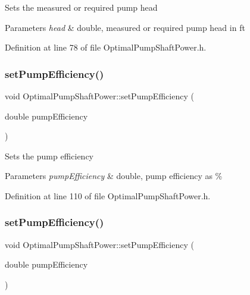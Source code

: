 Sets the measured or required pump head 
\begin{DoxyParams}{Parameters}
{\em head} & double, measured or required pump head in ft \\
\hline
\end{DoxyParams}


Definition at line 78 of file Optimal\+Pump\+Shaft\+Power.\+h.

\mbox{\label{class_optimal_pump_shaft_power_a2cb2c6b537c7db0bc5071f09c66308d0}} 
\subsubsection{\texorpdfstring{set\+Pump\+Efficiency()}{setPumpEfficiency()}\hspace{0.1cm}{\footnotesize\ttfamily [1/3]}}
{\footnotesize\ttfamily void Optimal\+Pump\+Shaft\+Power\+::set\+Pump\+Efficiency (\begin{DoxyParamCaption}\item[{double}]{pump\+Efficiency }\end{DoxyParamCaption})\hspace{0.3cm}{\ttfamily [inline]}}

Sets the pump efficiency 
\begin{DoxyParams}{Parameters}
{\em pump\+Efficiency} & double, pump efficiency as \% \\
\hline
\end{DoxyParams}


Definition at line 110 of file Optimal\+Pump\+Shaft\+Power.\+h.

\mbox{\label{class_optimal_pump_shaft_power_a2cb2c6b537c7db0bc5071f09c66308d0}} 
\subsubsection{\texorpdfstring{set\+Pump\+Efficiency()}{setPumpEfficiency()}\hspace{0.1cm}{\footnotesize\ttfamily [2/3]}}
{\footnotesize\ttfamily void Optimal\+Pump\+Shaft\+Power\+::set\+Pump\+Efficiency (\begin{DoxyParamCaption}\item[{double}]{pump\+Efficiency }\end{DoxyParamCaption})\hspace{0.3cm}{\ttfamily [inline]}}

